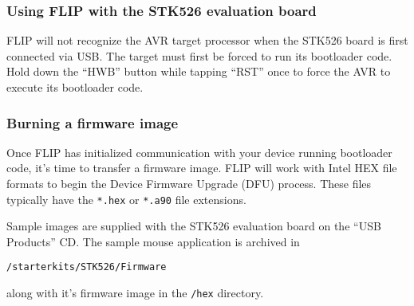 \subsubsection{Using FLIP with the STK526 evaluation board}
FLIP will not recognize the AVR target processor when the STK526 board is 
first connected via USB.  The target must first be forced to run its 
bootloader code.  Hold down the ``HWB'' button while tapping ``RST'' once to 
force the AVR to execute its bootloader code.

\subsubsection{Burning a firmware image}
Once FLIP has initialized communication with your device running bootloader 
code, it's time to transfer a firmware image.  FLIP will work with Intel HEX 
file formats to begin the Device Firmware Upgrade (DFU) process.  These files 
typically have the \verb+*.hex+ or \verb+*.a90+ file extensions.

Sample images are supplied with the STK526 evaluation board on the ``USB 
Products'' CD.  The sample mouse application is archived in
\begin{center}
\verb+/starterkits/STK526/Firmware+
\end{center}
along with it's firmware image in the \verb+/hex+ directory.
